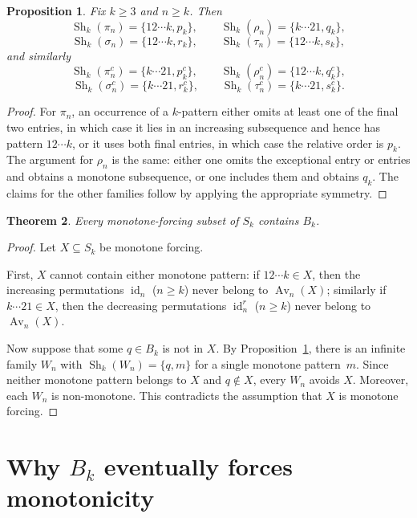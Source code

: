 \documentclass[11pt]{amsart}
\newcommand{\Sym}{S}
\newcommand{\Av}{\operatorname{Av}}
\newcommand{\Sh}{\operatorname{Sh}}
\newcommand{\id}{\operatorname{id}}
\theoremstyle{plain}
\newtheorem{theorem}{Theorem}[section]
\newtheorem{proposition}[theorem]{Proposition}
\theoremstyle{definition}
\theoremstyle{remark}
\begin{document}
\begin{proposition}\label{prop:witness-families}
  Fix $k \geq 3$ and $n \geq k$.  Then
  \[
    \Sh_k(\pi_n) = \{12\cdots k, p_k\},\qquad
    \Sh_k(\rho_n) = \{k\cdots 21, q_k\},
  \]
  \[
    \Sh_k(\sigma_n) = \{12\cdots k, r_k\},\qquad
    \Sh_k(\tau_n) = \{12\cdots k, s_k\},
  \]
  and similarly
  \[
    \Sh_k(\pi_n^c)=\{k\cdots 21,p_k^c\},\qquad
    \Sh_k(\rho_n^c)=\{12\cdots k,q_k^c\},
  \]
  \[
    \Sh_k(\sigma_n^c)=\{k\cdots 21,r_k^c\},\qquad
    \Sh_k(\tau_n^c)=\{k\cdots 21,s_k^c\}.
  \]
\end{proposition}

\begin{proof}
  For $\pi_n$, an occurrence of a $k$-pattern either omits at least one of the final two entries, in
  which case it lies in an increasing subsequence and hence has pattern $12\cdots k$, or it uses both
  final entries, in which case the relative order is $p_k$.  The argument for $\rho_n$ is the same:
  either one omits the exceptional entry or entries and obtains a monotone
  subsequence, or one includes them and obtains $q_k$.  The claims for the
  other families follow by applying the appropriate symmetry.
\end{proof}

\begin{theorem}\label{thm:minimality}
  Every monotone-forcing subset of $\Sym_k$ contains $B_k$.
\end{theorem}

\begin{proof}
  Let $X \subseteq \Sym_k$ be monotone forcing.

  First, $X$ cannot contain either monotone pattern: if $12\cdots k \in X$, then the increasing
  permutations $\id_n$ ($n \geq k$) never belong to $\Av_n(X)$; similarly if $k\cdots 21 \in X$, then the
  decreasing permutations $\id_n^r$ ($n \geq k$) never belong to $\Av_n(X)$.

  Now suppose that some $q \in B_k$ is not in $X$.  By Proposition~\ref{prop:witness-families},
  there is an infinite family $W_n$ with $\Sh_k(W_n) = \{q, m\}$ for a single monotone pattern~$m$.
  Since neither monotone pattern belongs to $X$ and $q \notin X$, every $W_n$ avoids $X$.
  Moreover, each $W_n$ is non-monotone.  This contradicts the assumption that $X$ is
  monotone forcing.
\end{proof}

\section{Why \texorpdfstring{$B_k$}{Bk} eventually forces monotonicity}
\end{document}
